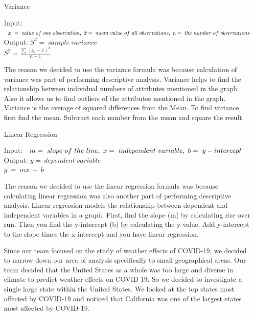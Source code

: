 \documentclass[10pt,journal,compsoc]{IEEEtran}
\begin{document}
{\SetAlgoNoLine
	\begin{algorithm} 
		\caption{Variance} %
		\label{Algo:Calculate Variance :BWLP}
		Input: $\ 
		\ x_i = \ value \ of \ one \ observation, \newline
		\ \bar{x} = \ mean \ value \ of \ all\ observations, \newline
		\ n = \ the \ number \ of \ observations
		$\\
		Output: $  S^2 = \ sample \ variance $\\
			
$ 			 	S^2 = \frac{\sum (x_i - \bar{x})^2}{n - 1} $
	\end{algorithm}

	The reason we decided to use the variance formula was because calculation of variance was part of performing descriptive analysis. Variance helps to find the relationship between individual numbers of attributes mentioned in the graph. Also it allows us to find outliers of the attributes mentioned in the graph. Variance is the average of squared differences from the Mean. To find variance, first find the mean. Subtract each number from the mean and square the result.

{\SetAlgoNoLine
	\begin{algorithm} 
		\caption{Linear Regression} %
		\label{Algo:Calculate Linear Regression :BWLP}
		Input: $\ 
		 \ m = \ slope \ of \ the \ line, \newline
 		\ x = \ independent \ variable, \newline
		\ b = \ y-intercept
		$\\
		Output: $ y = \ dependent \ variable $\\
			
$ 			 	y  \ = \ mx \ + \ b $
	\end{algorithm}

	The reason we decided to use the linear regression formula was because calculating linear regression was also another part of performing descriptive analysis. Linear regression models the relationship between dependent and independent variables in a graph. First, find the slope (m) by calculating rise over run. Then you find the y-intercept (b) by calculating the y-value. Add y-intercept to the slope times the x-intercept and you have linear regression.

	Since our team focused on the study of weather effects of COVID-19, we decided to narrow down our area of analysis specifically to small geographical areas. Our team decided that the United States as a whole was too large and diverse in climate to predict weather effects on COVID-19. So we decided to investigate a single large state within the United States. We looked at the top states most affected by COVID-19 and noticed that California was one of the largest states most affected by COVID-19. 

}}
\end{document}
